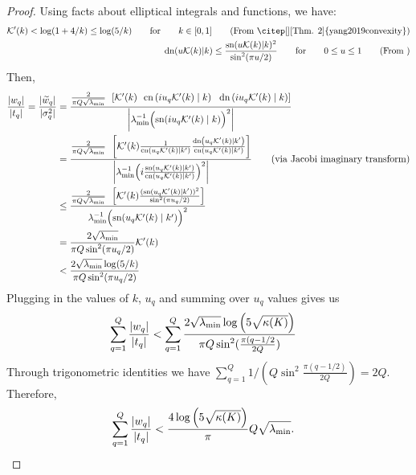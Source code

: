 \begin{proof}
  Using facts about elliptical integrals and functions, we have:
  \begin{align}
    \mathcal{K}'(k) < \log(1 + 4 / k) \leq \log( 5 / k) \qquad {\rm for} \qquad k \in [0, 1]
    \tag{From \citep[][Thm. 2]{yang2019convexity}}
    \\
    \text{dn}(u \mathcal{K}(k) | k ) \le \frac{\text{sn}(u \mathcal{K}(k) | k )^2}{\sin^2(\pi u/2)} \qquad {\rm for} \qquad 0 \le u \le 1
    \tag{From \gp{? maybe \citep{siegl2016extremal}}}
  \end{align}
  Then,
  \begin{align*}
    \frac{|w_q|}{|t_q|}
    =
    \frac{|\widetilde w_q|}{|\sigma^2_q|}
    &= \frac{
      \frac{ 2 }{ \pi Q \sqrt{\lambda_\text{min}} }
      \:\: \left[
      \mathcal{K}'( k )
      \:\:\: \text{cn} \left( i u_q \mathcal{K}'(k) \mid k \right)
      \:\:\: \text{dn} \left( i u_q \mathcal{K}'(k) \mid k \right)
      \right]
    }{
      \left| \lambda_\text{min}^{-1} \Bigl( \text{sn}(i u_q \mathcal{K}'(k) \mid k) \Bigr)^2 \right|
    }
    \\
    &= \frac{
      \frac{ 2 }{ \pi Q \sqrt{\lambda_\text{min}} }
      \:\: \left[
      \mathcal{K}'( k )
      \frac{
        1
      }{
        \text{cn} \left( u_q \mathcal{K}'(k) \mid k' \right)
      }
      \frac{
        \text{dn} \left( u_q \mathcal{K}'(k) \mid k' \right)
      }{
        \text{cn} \left( u_q \mathcal{K}'(k) \mid k' \right)
      }
      \right]
    }{
      \left| \lambda_\text{min}^{-1} \Bigl( i \frac{
        \text{sn}(u_q \mathcal{K}'(k) \mid k')
      }{
        \text{cn}(u_q \mathcal{K}'(k) \mid k')
      }\Bigr)^2 \right|
    }
    \tag{via Jacobi imaginary transform}
    \\
    &\leq \frac{
      \frac{ 2 }{ \pi Q \sqrt{\lambda_\text{min}} }
      \:\: \left[
        \mathcal{K}'( k ) \frac{
          ({
            \text{sn}(u_q \mathcal{K}'(k) \mid k')
          })^2
        }{
          \sin^2 ( \pi u_q / 2)
        }
      \right]
    }{
      \lambda_\text{min}^{-1} \Bigl({
        \text{sn}(u_q \mathcal{K}'(k) \mid k')
      }\Bigr)^2
    }
    \\
    &= \frac{ 2 \sqrt{\lambda_\text{min}} }{ \pi Q \sin^2 ( \pi u_q / 2) } \mathcal{K}'(k)
    \\
    &< \frac{ 2 \sqrt{\lambda_\text{min}} \log(5 / k) }{ \pi Q \sin^2 ( \pi u_q / 2) }
  \end{align*}
  Plugging in the values of $k$, $u_q$ and summing over $u_q$ values gives us
  \begin{align}
    \sum_{q=1}^Q \frac{|w_q|}{|t_q|}
    &<
    \sum_{q=1}^Q \frac{ 2 \sqrt{\lambda_\text{min}} \log \left( 5 \sqrt{\kappa(K)} \right)}
    { \pi Q \sin^2 ( \frac{\pi (q - 1/2}{2Q}) }
  \end{align}
  Through trigonometric identities we have
  $\sum_{q=1}^Q 1 / ( Q \sin^2 \frac{\pi(q- 1/2 )}{2Q} )  = 2 Q$.
  Therefore,
  \begin{align*}
    \sum_{q=1}^Q \frac{|w_q|}{|t_q|}
    &< \frac{4 \log \left( 5 \sqrt{\kappa(K)} \right)}{\pi} Q \sqrt{\lambda_\text{min}}.
  \end{align*}
\end{proof}
